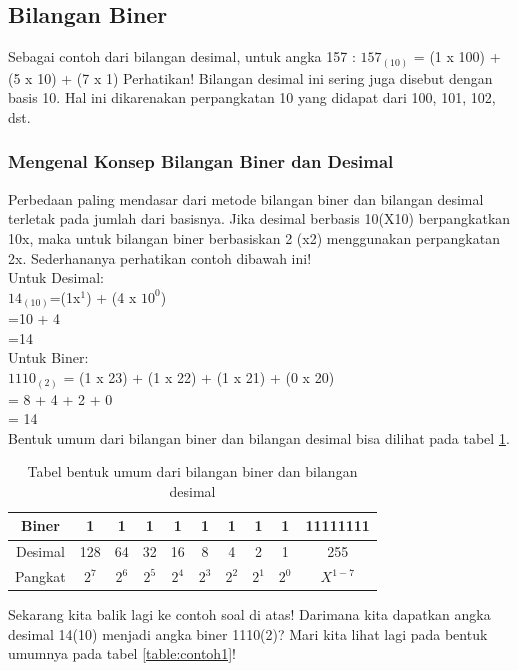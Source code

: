 \documentclass{article}
\begin{document}
\subsection{Bilangan Biner}
Sebagai contoh dari bilangan desimal, untuk angka 157 : $157_{(10)}$ = (1 x 100) + (5 x 10) + (7 x 1) 
Perhatikan! Bilangan desimal ini sering juga disebut dengan basis 10. Hal ini dikarenakan perpangkatan 10 yang didapat dari 100, 101, 102, dst. 
\subsubsection{Mengenal Konsep Bilangan Biner dan Desimal}
Perbedaan paling mendasar dari metode bilangan biner dan bilangan desimal terletak pada jumlah dari basisnya. Jika desimal berbasis 10(X10) berpangkatkan 10x, maka untuk bilangan biner berbasiskan 2 (x2) menggunakan perpangkatan 2x. Sederhananya perhatikan contoh dibawah ini!\\
Untuk Desimal:\\
$14_{(10)}$=(1x$^1$) + (4 x $10^0$)\\
=10 + 4\\
=14\\
Untuk Biner: \\
$1110_{(2)}$ = (1 x 23) + (1 x 22) + (1 x 21) + (0 x 20)\\
 = 8 + 4 + 2 + 0\\
 = 14\\

Bentuk umum dari bilangan biner dan bilangan desimal bisa dilihat pada tabel \ref{table:binerdesimal}. 

\begin{table}[h!]
\centering
\begin{tabular}{ |c|c|c|c|c|c|c|c|c|c| } 
\hline
Biner & 1 & 1 & 1 & 1 & 1 & 1 & 1 & 1 & 11111111 \\ 
\hline
Desimal & 128 & 64 & 32 & 16 & 8 & 4 & 2 & 1 & 255 \\ 
\hline
Pangkat & $2^7$ & $2^6$ & $2^5$ & $2^4$ & $2^3$ & $2^2$ & $2^1$ & $2^0$ & $X^{1-7}$ \\ 
\hline
\end{tabular}
\caption{Tabel bentuk umum dari bilangan biner dan bilangan desimal}
\label{table:binerdesimal}
\end{table}

Sekarang kita balik lagi ke contoh soal di atas! Darimana kita dapatkan angka desimal 14(10) menjadi angka biner 1110(2)? 
Mari kita lihat lagi pada bentuk umumnya pada tabel \ref{table:contoh1}!
\end{document}
